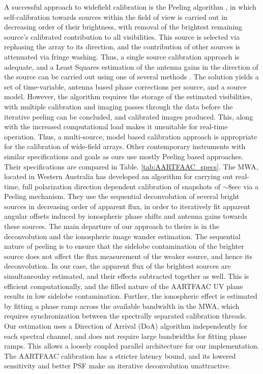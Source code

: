\documentclass{aa}
\begin{document}
A successful approach to widefield calibration is the Peeling algorithm
\citep{noordam2004peel,vdTol2007selfcallofar}, in which self-calibration
towards sources within the field of view is carried out in decreasing
order of their brightness, with removal of the brightest remaining
source's calibrated contribution to all visibilities. This source
is selected via rephasing the array to its direction, and the contribution
of other sources is attenuated via fringe washing. Thus, a single
source calibration approach is adequate, and a Least Squares estimation
of the antenna gains in the direction of the source can be carried
out using one of several methods \citep{boonstra2003gain}. The solution
yields a set of time-variable, antenna based phase corrections per
source, and a source model. However, the algorithm requires the storage
of the estimated visibilities, with multiple calibration and imaging
passes through the data before the iterative peeling can be concluded,
and calibrated images produced. This, along with the increased computational
load makes it unsuitable for real-time operation. Thus, a multi-source,
model based calibration approach is appropriate for the calibration
of wide-field arrays. 
Other contemporary instruments with similar specifications and goals
as ours use mostly Peeling based approaches. Their specifications
are compared in Table. \ref{tab:AARTFAAC_specs}. The MWA\citep{lonsdale2009murchison},
located in Western Australia has developed an algorithm for carrying
out real-time, full polarization direction dependent calibration of
snapshots of $\sim$8sec via a Peeling mechanism\citep{mitchell2008real}.
They use the sequential deconvolution of several bright sources in
decreasing order of apparent flux, in order to iteratively fit apparent
angular offsets induced by ionospheric phase shifts and antenna gains
towards these sources. The main departure of our approach to theirs
is in the deconvolution and the ionospheric image wander estimation.
The sequential nature of peeling is to ensure that the sidelobe contamination
of the brighter source does not affect the flux measurement of the
weaker source, and hence its deconvolution. In our case, the apparent
flux of the brightest sources are simultaneoulsy estimated, and their
effects subtracted together as well. This is efficient computationally,
and the filled nature of the AARTFAAC UV plane results in low sidelobe
contamination. Further, the ionospheric effect is estimated by fitting
a phase ramp across the available bandwidth in the MWA, which requires
synchronization between the spectrally separated calibration threads.
Our estimation uses a Direction of Arrival (DoA) algorithm independently
for each spectral channel, and does not require large bandwidths for
fitting phase ramps. This allows a loosely coupled parallel architecture
for our implementation. The AARTFAAC calibration has a stricter latency
bound, and its lowered sensitivity and better PSF make an iterative
deconvolution unattractive.
\end{document}
